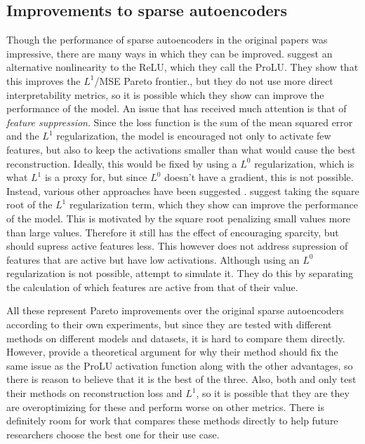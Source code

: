 \documentclass[../../main.tex]{subfiles}
\begin{document}
\subsection{Improvements to sparse autoencoders}\label{sec:improvements_to_saes}
Though the performance of sparse autoencoders in the original papers \citep{bricken_towards_2023}\citep{cunningham_sparse_2023} was impressive, there are many ways in which they can be improved.
\citet{taggart_prolu_2024} suggest an alternative nonlinearity to the ReLU, which they call the ProLU.
They show that this improves the $L^1$/MSE Pareto frontier., but they do not use more direct interpretability metrics, so it is possible  which they show can improve the performance of the model.
An issue that has received much attention is that of \emph{feature suppression}.
Since the loss function is the sum of the mean squared error and the $L^1$ regularization, the model is encouraged not only to activate few features, but also to keep the activations smaller than what would cause the best reconstruction.
Ideally, this would be fixed by using a $L^0$ regularization, which is what $L^1$ is a proxy for, but since $L^0$ doesn't have a gradient, this is not possible.
Instead, various other approaches have been suggested \citep{wright_addressing_2024}.
\citet{riggs_improving_2024} suggest taking the square root of the $L^1$ regularization term, which they show can improve the performance of the model.
This is motivated by the square root penalizing small values more than large values.
Therefore it still has the effect of encouraging sparcity, but should supress active features less.
This however does not address supression of features that are active but have low activations.
Although using an $L^0$ regularization is not possible, \citet{rajamanoharan_improving_2024} attempt to simulate it.
They do this by separating the calculation of which features are active from that of their value.

All these represent Pareto improvements over the original sparse autoencoders according to their own experiments, but since they are tested with different methods on different models and datasets, it is hard to compare them directly.
However, \citet{rajamanoharan_improving_2024} provide a theoretical argument for why their method should fix the same issue as the ProLU activation function along with the other advantages, so there is reason to believe that it is the best of the three.
Also, both \citet{taggart_prolu_2024} and \citet{riggs_improving_2024} only test their methods on reconstruction loss and $L^1$, so it is possible that they are they are overoptimizing for these and perform worse on other metrics.
There is definitely room for work that compares these methods directly to help future researchers choose the best one for their use case.
\end{document}
